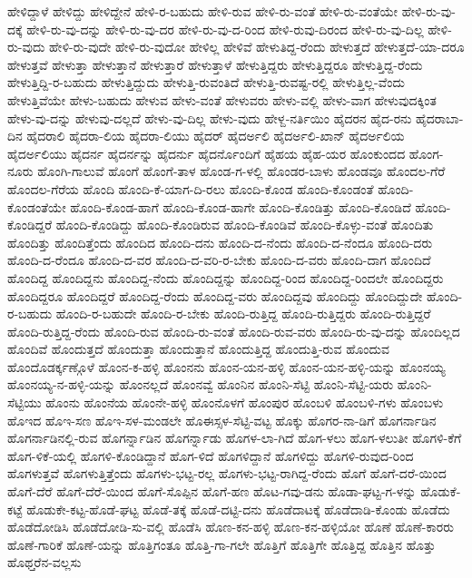ಹೇಳಿದ್ದಾಳೆ
ಹೇಳಿದ್ದು
ಹೇಳಿದ್ದೇನೆ
ಹೇಳಿ-ರ-ಬಹುದು
ಹೇಳಿ-ರುವ
ಹೇಳಿ-ರು-ವಂತೆ
ಹೇಳಿ-ರು-ವಂತೆಯೇ
ಹೇಳಿ-ರು-ವು-ದಕ್ಕೆ
ಹೇಳಿ-ರು-ವು-ದನ್ನು
ಹೇಳಿ-ರು-ವು-ದರ
ಹೇಳಿ-ರು-ವು-ದ-ರಿಂದ
ಹೇಳಿ-ರುವು-ದಿರಂದ
ಹೇಳಿ-ರು-ವು-ದಿಲ್ಲ
ಹೇಳಿ-ರು-ವುದು
ಹೇಳಿ-ರು-ವುದೇ
ಹೇಳಿ-ರು-ವುದೋ
ಹೇಳಿಲ್ಲ
ಹೇಳಿವೆ
ಹೇಳುತಿದ್ದ-ರೆಂದು
ಹೇಳುತ್ತದೆ
ಹೇಳುತ್ತದೆ-ಯಾ-ದರೂ
ಹೇಳುತ್ತವೆ
ಹೇಳುತ್ತಾ
ಹೇಳುತ್ತಾನೆ
ಹೇಳುತ್ತಾರೆ
ಹೇಳುತ್ತಾಳೆ
ಹೇಳುತ್ತಿದ್ದರು
ಹೇಳುತ್ತಿದ್ದರೂ
ಹೇಳುತ್ತಿದ್ದ-ರೆಂದು
ಹೇಳುತ್ತಿದ್ದಿ-ರ-ಬಹುದು
ಹೇಳುತ್ತಿದ್ದುದು
ಹೇಳುತ್ತಿ-ರುವಂತಿದೆ
ಹೇಳುತ್ತಿ-ರುವಷ್ಟ-ರಲ್ಲಿ
ಹೇಳುತ್ತಿಲ್ಲ-ವೆಂದು
ಹೇಳುತ್ತಿವೆಯೇ
ಹೇಳು-ಬಹುದು
ಹೇಳುವ
ಹೇಳು-ವಂತೆ
ಹೇಳುವರು
ಹೇಳು-ವಲ್ಲಿ
ಹೇಳು-ವಾಗ
ಹೇಳುವುದಕ್ಕಿಂತ
ಹೇಳು-ವು-ದನ್ನು
ಹೇಳುವು-ದಲ್ಲದೆ
ಹೇಳು-ವು-ದಿಲ್ಲ
ಹೇಳು-ವುದು
ಹೇಳ್ದ-ನರ್ತಿಯಿಂ
ಹೈದರನ
ಹೈದ-ರನು
ಹೈದರಾಬಾ-ದಿನ
ಹೈದರಾಲಿ
ಹೈದರಾ-ಲಿಯ
ಹೈದರಾ-ಲಿಯು
ಹೈದರ್
ಹೈದರ್ಅಲಿ
ಹೈದರ್ಅಲಿ-ಖಾನ್
ಹೈದರ್ಅಲಿಯ
ಹೈದರ್ಅಲಿಯು
ಹೈದರ್ನ
ಹೈದರ್ನನ್ನು
ಹೈದರ್ನು
ಹೈದರ್ನೊಂದಿಗೆ
ಹೈಹಯ
ಹೈಹ-ಯರ
ಹೊಂಕುಂದದ
ಹೊಂಗ-ನೂರು
ಹೊಂಗಿ-ಗಾಲುವೆ
ಹೊಂಗೆ
ಹೊಂಗೆ-ತಾಳ
ಹೊಂಡ-ಗ-ಳಲ್ಲಿ
ಹೊಂಡರ-ಬಾಳು
ಹೊಂಡವೂ
ಹೊಂದಲ-ಗೆರೆ
ಹೊಂದಲ-ಗೆರೆಯ
ಹೊಂದಿ
ಹೊಂದಿ-ಕೆ-ಯಾಗ-ದಿ-ರಲು
ಹೊಂದಿ-ಕೊಂಡ
ಹೊಂದಿ-ಕೊಂಡಂತೆ
ಹೊಂದಿ-ಕೊಂಡಂತೆಯೇ
ಹೊಂದಿ-ಕೊಂಡ-ಹಾಗೆ
ಹೊಂದಿ-ಕೊಂಡ-ಹಾಗೇ
ಹೊಂದಿ-ಕೊಂಡಿತ್ತು
ಹೊಂದಿ-ಕೊಂಡಿದೆ
ಹೊಂದಿ-ಕೊಂಡಿದ್ದರೆ
ಹೊಂದಿ-ಕೊಂಡಿದ್ದು
ಹೊಂದಿ-ಕೊಂಡಿರುವ
ಹೊಂದಿ-ಕೊಂಡಿವೆ
ಹೊಂದಿ-ಕೊಳ್ಳು-ವಂತೆ
ಹೊಂದಿತು
ಹೊಂದಿತ್ತು
ಹೊಂದಿತ್ತೆಂದು
ಹೊಂದಿದ
ಹೊಂದಿ-ದನು
ಹೊಂದಿ-ದ-ನೆಂದು
ಹೊಂದಿ-ದ-ನೆಂದೂ
ಹೊಂದಿ-ದರು
ಹೊಂದಿ-ದ-ರೆಂದೂ
ಹೊಂದಿ-ದ-ವರ
ಹೊಂದಿ-ದ-ವರಿ-ರ-ಬೇಕು
ಹೊಂದಿ-ದ-ವರು
ಹೊಂದಿ-ದಾಗ
ಹೊಂದಿದೆ
ಹೊಂದಿದ್ದ
ಹೊಂದಿದ್ದನು
ಹೊಂದಿದ್ದ-ನೆಂದು
ಹೊಂದಿದ್ದನ್ನು
ಹೊಂದಿದ್ದ-ರಿಂದ
ಹೊಂದಿದ್ದ-ರಿಂದಲೇ
ಹೊಂದಿದ್ದರು
ಹೊಂದಿದ್ದರೂ
ಹೊಂದಿದ್ದರೆ
ಹೊಂದಿದ್ದ-ರೆಂದು
ಹೊಂದಿದ್ದ-ವರು
ಹೊಂದಿದ್ದವು
ಹೊಂದಿದ್ದು
ಹೊಂದಿದ್ದುದೇ
ಹೊಂದಿ-ರ-ಬಹುದು
ಹೊಂದಿ-ರ-ಬಹುದೇ
ಹೊಂದಿ-ರ-ಬೇಕು
ಹೊಂದಿ-ರುತ್ತಿದ್ದ
ಹೊಂದಿ-ರುತ್ತಿದ್ದರು
ಹೊಂದಿ-ರುತ್ತಿದ್ದರೆ
ಹೊಂದಿ-ರುತ್ತಿದ್ದ-ರೆಂದು
ಹೊಂದಿ-ರುವ
ಹೊಂದಿ-ರು-ವಂತೆ
ಹೊಂದಿ-ರುವ-ವರು
ಹೊಂದಿ-ರು-ವು-ದನ್ನು
ಹೊಂದಿಲ್ಲದ
ಹೊಂದಿವೆ
ಹೊಂದುತ್ತದೆ
ಹೊಂದುತ್ತಾ
ಹೊಂದುತ್ತಾನೆ
ಹೊಂದುತ್ತಿದ್ದ
ಹೊಂದುತ್ತಿ-ರುವ
ಹೊಂದುವ
ಹೊಂದೊಡರ್ಕ್ಕಣ್ಗೊಳೆ
ಹೊಂನ-ಕ-ಹಳ್ಳಿ
ಹೊಂನನು
ಹೊಂನ-ಯನ-ಹಳ್ಳಿ
ಹೊಂನ-ಯನ-ಹಳ್ಳಿ-ಯನ್ನು
ಹೊಂನಯ್ಯ
ಹೊಂನಯ್ಯ-ನ-ಹಳ್ಳಿ-ಯನ್ನು
ಹೊಂನಲ್ಲದೆ
ಹೊಂನವ್ವೆ
ಹೊಂನಿನ
ಹೊಂನಿ-ಸೆಟ್ಟಿ
ಹೊಂನಿ-ಸೆಟ್ಟಿ-ಯರು
ಹೊಂನಿ-ಸೆಟ್ಟಿಯು
ಹೊಂನು
ಹೊಂನೆಯ
ಹೊಂನೇ-ಹಳ್ಳಿ
ಹೊಂನೊಳಗೆ
ಹೊಂಪುರ
ಹೊಂಬಳಿ
ಹೊಂಬಳಿ-ಗಳು
ಹೊಂಬಳು
ಹೊಇದ
ಹೊಇ-ಸಣ
ಹೊಇ-ಸಳ-ಮಂಡಲೇ
ಹೊಈಸ್ಸಳ-ಸೆಟ್ಟಿ-ವಟ್ಟ
ಹೊಕ್ಕು
ಹೊಗರ-ನಾ-ಡಿಗೆ
ಹೊಗರ್ನಾಡಿನ
ಹೊಗರ್ನಾಡಿನಲ್ಲಿ-ರುವ
ಹೊಗರ್ನ್ನಾಡಿನ
ಹೊಗರ್ನ್ನಾಡು
ಹೊಗಳ-ಲಾ-ಗಿದೆ
ಹೊಗ-ಳಲು
ಹೊಗ-ಳಲುತೀ
ಹೊಗಳಿ-ಕೆಗೆ
ಹೊಗ-ಳಿಕೆ-ಯಲ್ಲಿ
ಹೊಗಳಿ-ಕೊಂಡಿದ್ದಾನೆ
ಹೊಗ-ಳಿದೆ
ಹೊಗಳಿದ್ದಾನೆ
ಹೊಗಳಿದ್ದು
ಹೊಗಳಿ-ರುವುದ-ರಿಂದ
ಹೊಗಳುತ್ತವೆ
ಹೊಗಳುತ್ತಿತ್ತೆಂದು
ಹೊಗಳು-ಭಟ್ಟ-ರಲ್ಲ
ಹೊಗಳು-ಭಟ್ಟ-ರಾಗಿದ್ದ-ರೆಂದು
ಹೊಗೆ
ಹೊಗೆ-ದರೆ-ಯಿಂದ
ಹೊಗೆ-ದೆರೆ
ಹೊಗೆ-ದೆರೆ-ಯಿಂದ
ಹೊಗೆ-ಸೊಪ್ಪಿನ
ಹೊಗೆ-ಹಣ
ಹೊಟ-ಗವು-ಡನು
ಹೊಡಾ-ಘಟ್ಟ-ಗ-ಳನ್ನು
ಹೊಡುಕೆ-ಕಟ್ಟೆ
ಹೊಡುಕೇ-ಕಟ್ಟ-ಹೊಡೆ-ಘಟ್ಟ
ಹೊಡೆ-ತಕ್ಕೆ
ಹೊಡೆ-ದಟ್ಟಿ-ದನು
ಹೊಡೆದಾಟಕ್ಕೆ
ಹೊಡೆದಾಡಿ-ಕೊಂಡು
ಹೊಡೆದು
ಹೊಡೆದೋಡಿಸಿ
ಹೊಡೆದೋಡಿ-ಸು-ವಲ್ಲಿ
ಹೊಡೆಸಿ
ಹೊಣ-ಕನ-ಹಳ್ಳಿ
ಹೊಣ-ಕನ-ಹಳ್ಳಿಯೋ
ಹೊಣೆ
ಹೊಣೆ-ಕಾರರು
ಹೊಣೆ-ಗಾರಿಕೆ
ಹೊಣೆ-ಯನ್ನು
ಹೊತ್ತಿಗಂತೂ
ಹೊತ್ತಿ-ಗಾ-ಗಲೇ
ಹೊತ್ತಿಗೆ
ಹೊತ್ತಿಗೇ
ಹೊತ್ತಿದ್ದ
ಹೊತ್ತಿನ
ಹೊತ್ತು
ಹೊಥ್ತರೆನ-ವಲ್ಲಸು
